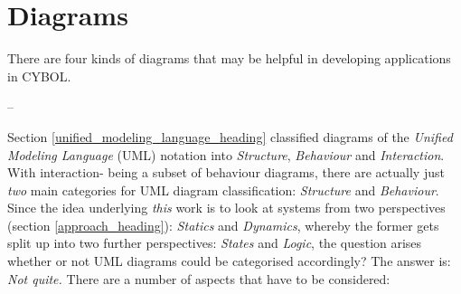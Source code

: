 %
%
%
%
%
%

\chapter{Diagrams}
\label{diagrams_heading}

There are four kinds of diagrams that may be helpful in developing applications
in CYBOL.

%
%
%
%

--

Section \ref{unified_modeling_language_heading} classified diagrams of the
\emph{Unified Modeling Language} (UML) notation into \emph{Structure},
\emph{Behaviour} and \emph{Interaction}. With interaction- being a subset of
behaviour diagrams, there are actually just \emph{two} main categories for UML
diagram classification: \emph{Structure} and \emph{Behaviour}. Since the idea
underlying \emph{this} work is to look at systems from two perspectives
(section \ref{approach_heading}): \emph{Statics} and \emph{Dynamics}, whereby
the former gets split up into two further perspectives: \emph{States} and
\emph{Logic}, the question arises whether or not UML diagrams could be
categorised accordingly? The answer is: \emph{Not quite.} There are a number of
aspects that have to be considered:

